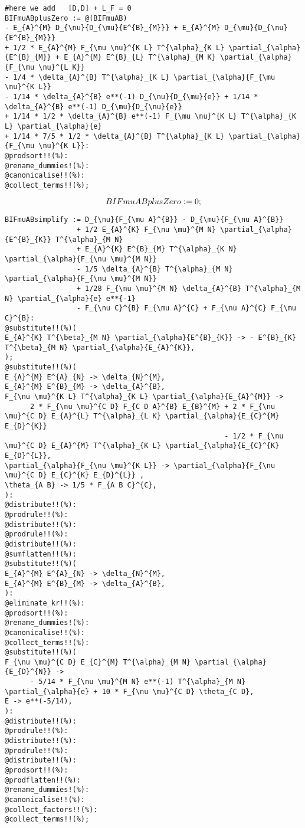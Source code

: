 \documentclass[11pt]{article}
\def\specialcolon{\mathrel{\mathop{:}}\hspace{-.5em}}
\begin{document}
{\color[named]{Blue}\begin{verbatim}
#here we add   [D,D] + L_F = 0
BIFmuABplusZero := @(BIFmuAB)
- E_{A}^{M} D_{\nu}{D_{\mu}{E^{B}_{M}}} + E_{A}^{M} D_{\mu}{D_{\nu}{E^{B}_{M}}}
+ 1/2 * E_{A}^{M} F_{\mu \nu}^{K L} T^{\alpha}_{K L} \partial_{\alpha}{E^{B}_{M}} + E_{A}^{M} E^{B}_{L} T^{\alpha}_{M K} \partial_{\alpha}{F_{\mu \nu}^{L K}}
- 1/4 * \delta_{A}^{B} T^{\alpha}_{K L} \partial_{\alpha}{F_{\mu \nu}^{K L}}
- 1/14 * \delta_{A}^{B} e**(-1) D_{\nu}{D_{\mu}{e}} + 1/14 * \delta_{A}^{B} e**(-1) D_{\mu}{D_{\nu}{e}}
+ 1/14 * 1/2 * \delta_{A}^{B} e**(-1) F_{\mu \nu}^{K L} T^{\alpha}_{K L} \partial_{\alpha}{e}
+ 1/14 * 7/5 * 1/2 * \delta_{A}^{B} T^{\alpha}_{K L} \partial_{\alpha}{F_{\mu \nu}^{K L}}:
@prodsort!!(%):
@rename_dummies!(%):
@canonicalise!!(%):
@collect_terms!!(%);
\end{verbatim}}
\begin{dmath*}[compact, spread=2pt]
BIFmuABplusZero\specialcolon{}= 0;
\end{dmath*}
{\color[named]{Blue}\begin{verbatim}
BIFmuABsimplify := D_{\nu}{F_{\mu A}^{B}} - D_{\mu}{F_{\nu A}^{B}}
                 + 1/2 E_{A}^{K} F_{\nu \mu}^{M N} \partial_{\alpha}{E^{B}_{K}} T^{\alpha}_{M N}
                 + E_{A}^{K} E^{B}_{M} T^{\alpha}_{K N} \partial_{\alpha}{F_{\nu \mu}^{M N}}
                 - 1/5 \delta_{A}^{B} T^{\alpha}_{M N} \partial_{\alpha}{F_{\nu \mu}^{M N}}
                 + 1/28 F_{\nu \mu}^{M N} \delta_{A}^{B} T^{\alpha}_{M N} \partial_{\alpha}{e} e**{-1}
                 - F_{\nu C}^{B} F_{\mu A}^{C} + F_{\nu A}^{C} F_{\mu C}^{B}:
@substitute!!(%)(
E_{A}^{K} T^{\beta}_{M N} \partial_{\alpha}{E^{B}_{K}} -> - E^{B}_{K} T^{\beta}_{M N} \partial_{\alpha}{E_{A}^{K}},
);
@substitute!!(%)(
E_{A}^{M} E^{A}_{N} -> \delta_{N}^{M},
E_{A}^{M} E^{B}_{M} -> \delta_{A}^{B},
F_{\nu \mu}^{K L} T^{\alpha}_{K L} \partial_{\alpha}{E_{A}^{M}} ->
      2 * F_{\nu \mu}^{C D} F_{C D A}^{B} E_{B}^{M} + 2 * F_{\nu \mu}^{C D} E_{A}^{L} T^{\alpha}_{L K} \partial_{\alpha}{E_{C}^{M} E_{D}^{K}}
                                                    - 1/2 * F_{\nu \mu}^{C D} E_{A}^{M} T^{\alpha}_{K L} \partial_{\alpha}{E_{C}^{K} E_{D}^{L}},
\partial_{\alpha}{F_{\nu \mu}^{K L}} -> \partial_{\alpha}{F_{\nu \mu}^{C D} E_{C}^{K} E_{D}^{L}} ,
\theta_{A B} -> 1/5 * F_{A B C}^{C},
):
@distribute!!(%):
@prodrule!!(%):
@distribute!!(%):
@prodrule!!(%):
@distribute!!(%):
@sumflatten!!(%):
@substitute!!(%)(
E_{A}^{M} E^{A}_{N} -> \delta_{N}^{M},
E_{A}^{M} E^{B}_{M} -> \delta_{A}^{B},
):
@eliminate_kr!!(%):
@prodsort!!(%):
@rename_dummies!(%):
@canonicalise!!(%):
@collect_terms!!(%):
@substitute!!(%)(
F_{\nu \mu}^{C D} E_{C}^{M} T^{\alpha}_{M N} \partial_{\alpha}{E_{D}^{N}} ->
      - 5/14 * F_{\nu \mu}^{M N} e**(-1) T^{\alpha}_{M N} \partial_{\alpha}{e} + 10 * F_{\nu \mu}^{C D} \theta_{C D},
E -> e**(-5/14),
):
@distribute!!(%):
@prodrule!!(%):
@distribute!!(%):
@prodrule!!(%):
@distribute!!(%):
@prodsort!!(%):
@prodflatten!!(%):
@rename_dummies!(%):
@canonicalise!!(%):
@collect_factors!!(%):
@collect_terms!!(%);
\end{verbatim}}
\end{document}
